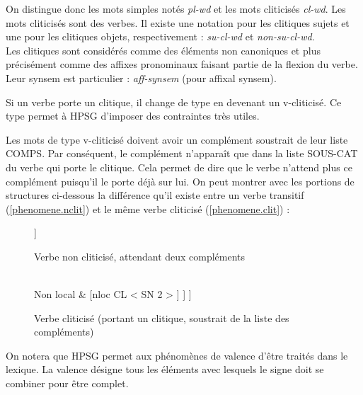 On distingue donc les mots simples notés \emph{pl-wd} et les mots cliticisés \emph{cl-wd}.
Les mots cliticisés sont des verbes.
Il existe une notation pour les clitiques sujets et une pour les clitiques objets, respectivement : \emph{su-cl-wd} et \emph{non-su-cl-wd}.\\

Les clitiques sont considérés comme des éléments non canoniques et plus précisément comme des affixes pronominaux faisant partie de la flexion du verbe.
Leur synsem est particulier : \emph{aff-synsem} (pour affixal synsem).

Si un verbe porte un clitique, il change de type en devenant un v-cliticisé.
Ce type permet à HPSG d'imposer des contraintes très utiles.

Les mots de type v-cliticisé doivent avoir un complément soustrait de leur liste COMPS.
Par conséquent, le complément n'apparaît que dans la liste SOUS-CAT du verbe qui porte le clitique.
Cela permet de dire que le verbe n'attend plus ce complément puisqu'il le porte déjà sur lui.
On peut montrer avec les portions de structures ci-dessous la différence qu'il existe entre un verbe transitif (\autoref{phenomene.nclit}) et le même verbe cliticisé (\autoref{phenomene.clit}) :\\

\begin{figure}[ht]
\centering
\begin{avm}
  [{}
    Phon & </\emph{mange}/> \\
    Synsem = Cat & [{cat}
                    sous-cat & < SN {1}, SN {2} >
                   ]
  ]
\end{avm}
\caption{Verbe non cliticisé, attendant deux compléments\label{phenomene.nclit}}
\end{figure}
\begin{figure}[ht]
\centering
\begin{avm}
  [{}
    Phon & </\emph{le mange}/> \\
    Synsem & [{synsem}
              Local = Cat & [{cat}
                             sous-cat < SN {1} >
                            ] \\
              Non local & [{nloc}
                           CL < SN {2} >
                          ]
             ]
  ]
\end{avm}
\caption{Verbe cliticisé (portant un clitique, soustrait de la liste des compléments)\label{phenomene.clit}}
\end{figure}

On notera que HPSG permet aux phénomènes de valence d'être traités dans le lexique.
La valence désigne tous les éléments avec lesquels le signe doit se combiner pour être complet.\\

